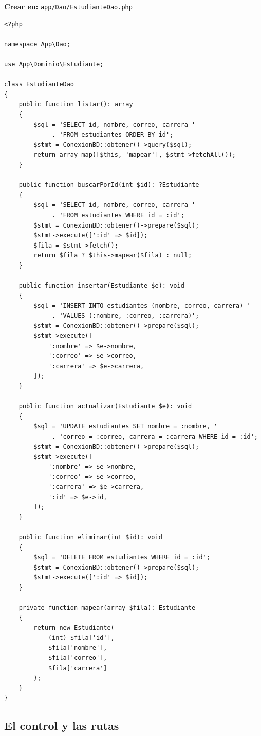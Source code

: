 \documentclass[11pt,a4paper,openany]{book}
\begin{document}
{\small\textbf{Crear en:} \texttt{app/Dao/EstudianteDao.php}}
\begin{lstlisting}[style=php,caption={EstudianteDao.php (CRUD con PDO, sin Eloquent)},label={lst:lv-dao}]
<?php

namespace App\Dao;

use App\Dominio\Estudiante;

class EstudianteDao
{
    public function listar(): array
    {
        $sql = 'SELECT id, nombre, correo, carrera '
             . 'FROM estudiantes ORDER BY id';
        $stmt = ConexionBD::obtener()->query($sql);
        return array_map([$this, 'mapear'], $stmt->fetchAll());
    }

    public function buscarPorId(int $id): ?Estudiante
    {
        $sql = 'SELECT id, nombre, correo, carrera '
             . 'FROM estudiantes WHERE id = :id';
        $stmt = ConexionBD::obtener()->prepare($sql);
        $stmt->execute([':id' => $id]);
        $fila = $stmt->fetch();
        return $fila ? $this->mapear($fila) : null;
    }

    public function insertar(Estudiante $e): void
    {
        $sql = 'INSERT INTO estudiantes (nombre, correo, carrera) '
             . 'VALUES (:nombre, :correo, :carrera)';
        $stmt = ConexionBD::obtener()->prepare($sql);
        $stmt->execute([
            ':nombre' => $e->nombre,
            ':correo' => $e->correo,
            ':carrera' => $e->carrera,
        ]);
    }

    public function actualizar(Estudiante $e): void
    {
        $sql = 'UPDATE estudiantes SET nombre = :nombre, '
             . 'correo = :correo, carrera = :carrera WHERE id = :id';
        $stmt = ConexionBD::obtener()->prepare($sql);
        $stmt->execute([
            ':nombre' => $e->nombre,
            ':correo' => $e->correo,
            ':carrera' => $e->carrera,
            ':id' => $e->id,
        ]);
    }

    public function eliminar(int $id): void
    {
        $sql = 'DELETE FROM estudiantes WHERE id = :id';
        $stmt = ConexionBD::obtener()->prepare($sql);
        $stmt->execute([':id' => $id]);
    }

    private function mapear(array $fila): Estudiante
    {
        return new Estudiante(
            (int) $fila['id'],
            $fila['nombre'],
            $fila['correo'],
            $fila['carrera']
        );
    }
}
\end{lstlisting}

\subsection{El control y las rutas}
\label{ap:crud:laravel:control}
\end{document}
